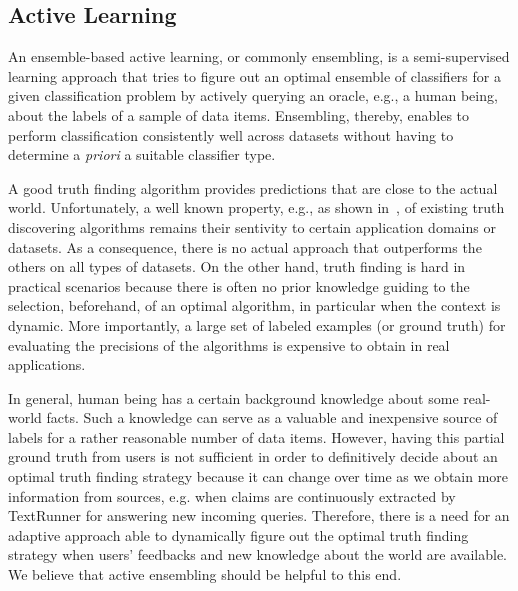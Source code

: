 \subsection{Active Learning}\label{activelearning}
\medskip
An ensemble-based active learning, or commonly ensembling, is a semi-supervised learning approach that tries
to figure out an optimal ensemble of classifiers for a given classification problem by actively querying an 
oracle, e.g., a human being, about the labels of a sample of data items. Ensembling, thereby, enables to perform
classification consistently well across datasets without having to determine a \emph{priori} a suitable classifier 
type.

A good truth finding algorithm provides  predictions that are close to the actual world. Unfortunately, 
a well known property, e.g., as shown in~\cite{Li12, Wagui14}, of existing truth discovering algorithms remains their sentivity
to certain application domains or datasets. As a consequence, there is no actual approach that outperforms the others on all types 
of datasets. On the other hand, truth finding is hard in practical scenarios because there is often no prior knowledge guiding to
the selection, beforehand, of an optimal algorithm, in particular when the context is dynamic. More importantly, a large set of labeled 
examples (or ground truth) for evaluating the precisions of the algorithms is expensive to obtain in real applications. 

In general, human being has a certain background knowledge about some real-world facts. Such a knowledge can serve as a valuable and inexpensive source of labels for a 
rather reasonable number of data items. However, having this partial ground truth from users is not sufficient in order to definitively decide about an optimal truth
finding strategy because it can change over time as we obtain more information from sources, e.g. when claims are continuously extracted by TextRunner for answering
new incoming queries. Therefore, there is a need for an adaptive approach able to dynamically figure out the optimal truth finding strategy when users' feedbacks and 
new knowledge about the world are available. We believe that active ensembling should be helpful to this end.

